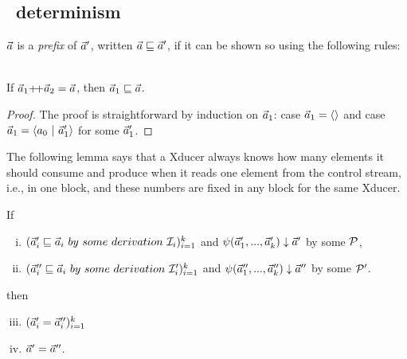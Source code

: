 \subsection{\fmsvcode \ determinism}

\begin{defi}
	$\vec a$ is a \emph{prefix} of $\vec a'$, written $\vec a \sqsubseteq \vec a'$, if it can be shown so using the following rules:\\
	
	\emph{}
	\\
	
\end{defi}

\begin{lem}\label{lem-app2pre}
	If $\a_1 {\++} \a_2 = \a$, then $\vec a_1 \sqsubseteq \vec a$.
\end{lem}
\begin{proof}
	The proof is straightforward by induction on $\vec a_1$: case $\vec a_1 = \langle \rangle$ and case $ \a_1 = \< a_0 \ | \ \a_1' \'>$ for some $\vec a_1'$.
\end{proof}

The following lemma says that a Xducer always knows how many elements it should consume and produce when it reads one element from the control stream, i.e., in one block, and these numbers are fixed in any block for the same Xducer.


\begin{lem} \label{lem-block-unique}
	If
	\begin{enumerate}[(i)]
		\item $(\a_i' \prefix  \a_i \ by \ some \ derivation \ \MI_{i})^k_{i=1}$ and ${\psi}(\vec a_1',...,\vec a_k') \downarrow \vec a'$ by some $\mathcal{P}$, 
		\item $(\a_i'' \prefix \a_i \ by \ some \ derivation \ \MI'_{i})^k_{i=1}$ and
		${\psi}(\vec a_1'',...,\vec a_k'') \downarrow \vec a''$ by some $\mathcal{P}'$.
	\end{enumerate} 
	then \begin{enumerate}[(i)]
		\setcounter{enumi}{2}
		\item $(\vec a_i' = \vec a_i'')^k_{i=1}$ 
		\item $\vec a' = \vec a''$.
	\end{enumerate}
\end{lem}

